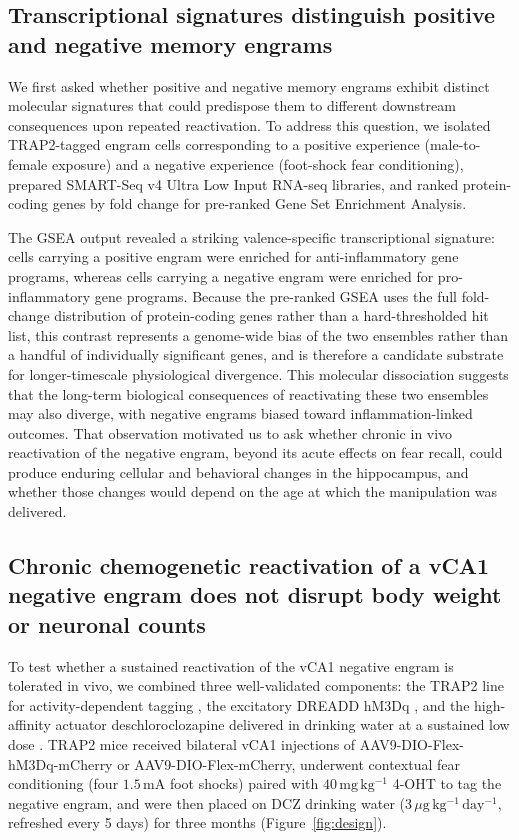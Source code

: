 \documentclass[11pt]{article}
\begin{document}
\subsection{Transcriptional signatures distinguish positive and negative memory engrams}

We first asked whether positive and negative memory engrams exhibit distinct molecular signatures that could predispose them to different downstream consequences upon repeated reactivation. To address this question, we isolated TRAP2-tagged engram cells corresponding to a positive experience (male-to-female exposure) and a negative experience (foot-shock fear conditioning), prepared SMART-Seq v4 Ultra Low Input RNA-seq libraries, and ranked protein-coding genes by fold change for pre-ranked Gene Set Enrichment Analysis.

The GSEA output revealed a striking valence-specific transcriptional signature: cells carrying a positive engram were enriched for anti-inflammatory gene programs, whereas cells carrying a negative engram were enriched for pro-inflammatory gene programs. Because the pre-ranked GSEA uses the full fold-change distribution of protein-coding genes rather than a hard-thresholded hit list, this contrast represents a genome-wide bias of the two ensembles rather than a handful of individually significant genes, and is therefore a candidate substrate for longer-timescale physiological divergence. This molecular dissociation suggests that the long-term biological consequences of reactivating these two ensembles may also diverge, with negative engrams biased toward inflammation-linked outcomes. That observation motivated us to ask whether chronic in vivo reactivation of the negative engram, beyond its acute effects on fear recall, could produce enduring cellular and behavioral changes in the hippocampus, and whether those changes would depend on the age at which the manipulation was delivered.

\subsection{Chronic chemogenetic reactivation of a vCA1 negative engram does not disrupt body weight or neuronal counts}

To test whether a sustained reactivation of the vCA1 negative engram is tolerated in vivo, we combined three well-validated components: the TRAP2 line for activity-dependent tagging \citep{denardo2019temporal}, the excitatory DREADD hM3Dq \citep{roth2016dreadds}, and the high-affinity actuator deschloroclozapine delivered in drinking water at a sustained low dose \citep{nagai2020dcz}. TRAP2 mice received bilateral vCA1 injections of AAV9-DIO-Flex-hM3Dq-mCherry or AAV9-DIO-Flex-mCherry, underwent contextual fear conditioning (four $1.5\,\mathrm{mA}$ foot shocks) paired with $40\,\mathrm{mg\,kg^{-1}}$ 4-OHT to tag the negative engram, and were then placed on DCZ drinking water ($3\,\mu\mathrm{g\,kg^{-1}\,day^{-1}}$, refreshed every 5 days) for three months (Figure~\ref{fig:design}).
\end{document}
